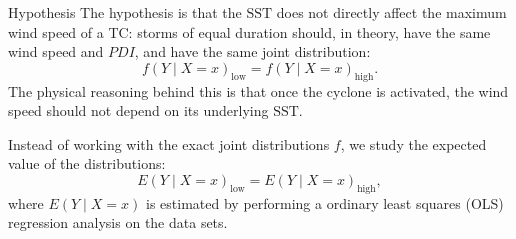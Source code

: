 \begin{block}{Hypothesis}
	The hypothesis is that the $\text{SST}$ does not directly affect the maximum wind speed of a TC: storms of equal duration should, in theory, have the same wind speed and $PDI$, and have the same joint distribution:
	\begin{equation}
		f(Y \mid X = x)_{\text{low}} = f(Y \mid X = x)_{\text{high}} .
	\end{equation}
	The physical reasoning behind this is that once the cyclone is activated, the wind speed should not depend on its underlying $\text{SST}$.

	Instead of working with the exact joint
	distributions $f$, we study the expected value of the distributions:
	\begin{equation}
		E(Y \mid X = x )_{\text{low}} = E(Y \mid X = x )_{\text{high}},
	\end{equation}
	where $E(Y \mid X = x )$ is estimated by performing a ordinary least squares (OLS) regression analysis on the data sets.

\end{block}



